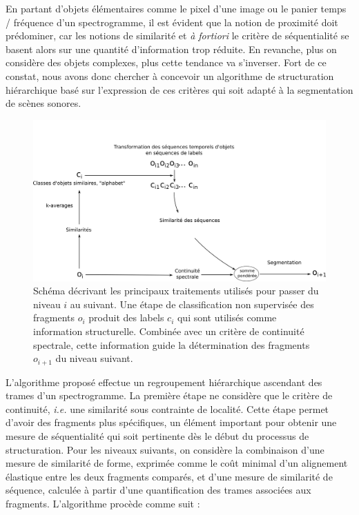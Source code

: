   En partant d'objets élémentaires comme le pixel d'une image ou le panier temps / fréquence d'un spectrogramme, il est évident que la notion de proximité doit prédominer, car les notions de similarité et \textit{à fortiori} le critère de séquentialité se basent alors sur une quantité d'information trop réduite.  En revanche, plus on considère des objets complexes, plus cette tendance va s'inverser. Fort de ce constat, nous avons donc chercher à concevoir un algorithme de structuration hiérarchique basé sur l'expression de ces critères qui soit adapté à la segmentation de scènes sonores\cite{rossignolhal-01122006}.

  \begin{figure}[t]
    \includegraphics[width=1\textwidth]{figures/alc_one_level.png}
    \caption{Schéma décrivant les principaux traitements utilisés pour passer du niveau $i$ au suivant. Une étape de classification non supervisée des fragments $o_i$ produit des labels $c_i$ qui sont utilisés comme information structurelle. Combinée avec un critère de continuité spectrale, cette information guide la détermination des fragments $o_{i+1}$ du niveau suivant.}\label{fig:alc}
  \end{figure}

  L'algorithme proposé effectue un regroupement hiérarchique ascendant des trames d'un spectrogramme. La première étape ne considère que le  critère de continuité, \textit{i.e.} une similarité sous contrainte de localité. Cette étape permet d'avoir des fragments plus spécifiques, un élément important pour obtenir une mesure de séquentialité qui soit pertinente dès le début du processus de structuration. Pour les niveaux suivants, on considère la combinaison d'une mesure de similarité de forme, exprimée comme le coût minimal d'un alignement élastique entre les deux fragments comparés, et d'une mesure de similarité de séquence, calculée à partir d'une quantification des trames associées aux fragments. L'algorithme procède comme suit :

